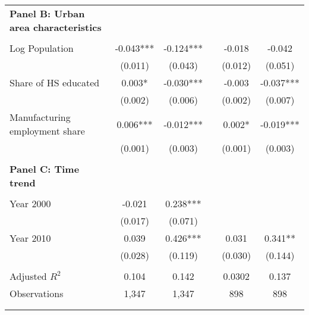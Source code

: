 \begin{tabular}{lccccc}
\textbf{Panel B: Urban area characteristics} &       &       &       &       &  \\
      &       &       &       &       &  \\
Log Population  & -0.043*** & -0.124*** &       & -0.018 & -0.042 \\
      & (0.011) & (0.043) &       & (0.012) & (0.051) \\
Share of HS educated & 0.003* & -0.030*** &       & -0.003 & -0.037*** \\
      & (0.002) & (0.006) &       & (0.002) & (0.007) \\
Manufacturing employment share & 0.006*** & -0.012*** &       & 0.002* & -0.019*** \\
      & (0.001) & (0.003) &       & (0.001) & (0.003) \\
      &       &       &       &       &  \\
\textbf{Panel C: Time trend} &       &       &       &       &  \\
      &       &       &       &       &  \\
Year 2000 & -0.021 & 0.238*** &       &       &  \\
      & (0.017) & (0.071) &       &       &  \\
Year 2010 & 0.039 & 0.426*** &       & 0.031 & 0.341** \\
      & (0.028) & (0.119) &       & (0.030) & (0.144) \\
      &       &       &       &       &  \\
Adjusted $R^2$ & 0.104 & 0.142 &       & 0.0302 & 0.137 \\
Observations & 1,347 & 1,347 &       & 898   & 898 \\
      &       &       &       &       &  \\
\bottomrule &       &       &       &       &  \\
\end{tabular}%
